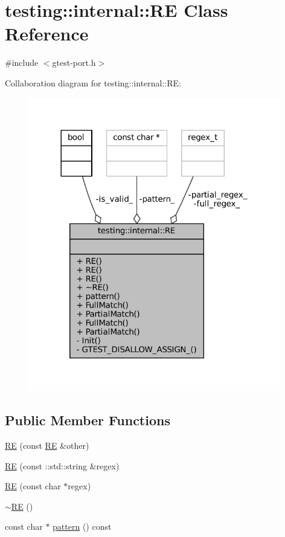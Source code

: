 \hypertarget{classtesting_1_1internal_1_1RE}{}\section{testing\+:\+:internal\+:\+:RE Class Reference}
\label{classtesting_1_1internal_1_1RE}


{\ttfamily \#include $<$gtest-\/port.\+h$>$}



Collaboration diagram for testing\+:\+:internal\+:\+:RE\+:
\nopagebreak
\begin{figure}[H]
\begin{center}
\leavevmode
\includegraphics[width=312pt]{classtesting_1_1internal_1_1RE__coll__graph}
\end{center}
\end{figure}
\subsection*{Public Member Functions}
\begin{DoxyCompactItemize}
\item 
\hyperlink{classtesting_1_1internal_1_1RE_ab215dbc2565fce641e1746ca43e9d68a}{RE} (const \hyperlink{classtesting_1_1internal_1_1RE}{RE} \&other)
\item 
\hyperlink{classtesting_1_1internal_1_1RE_a8840bd639642f3d4769a94a68ce463c2}{RE} (const \+::std\+::string \&regex)
\item 
\hyperlink{classtesting_1_1internal_1_1RE_a908ea936a5b7a14479a1b292a7189ca6}{RE} (const char $\ast$regex)
\item 
\hyperlink{classtesting_1_1internal_1_1RE_af3ad18e6c0b433f3d85ed23eda8119f3}{$\sim$\+RE} ()
\item 
const char $\ast$ \hyperlink{classtesting_1_1internal_1_1RE_a24236aab3a6b0183a145a6f4c0bb9848}{pattern} () const
\end{DoxyCompactItemize}
